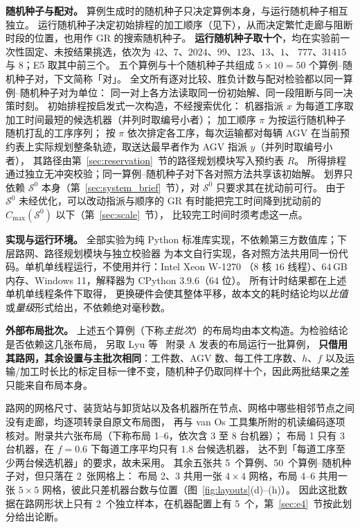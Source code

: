 \documentclass[manuscript,screen,review]{acmart}
\newcommand{\NInst}{5}
\newcommand{\NSeeds}{10}
\newcommand{\NPairs}{50}
\newcommand{\NPubInst}{5}
\newcommand{\NPubPairs}{50}
\newcommand{\NPubNets}{2}
\begin{document}
\textbf{随机种子与配对。}
算例生成时的随机种子只决定算例本身，与运行随机种子相互独立。
运行随机种子决定初始排程的加工顺序（见下），从而决定繁忙走廊与阻断时段的位置，也用作 GR 的搜索随机种子。
\textbf{运行随机种子取十个}，均在实验前一次性固定、未按结果挑选，依次为 \(42\)、\(7\)、\(2024\)、\(99\)、\(123\)、\(13\)、\(1\)、
\(777\)、\(31415\) 与 \(8\)；E5 取其中前三个。
五个算例与十个随机种子共组成 \(\NInst\times\NSeeds=\NPairs\) 个算例--随机种子对，下文简称「对」。
全文所有逐对比较、胜负计数与配对检验都以同一算例--随机种子对为单位：
同一对上各方法读取同一份初始解、同一段阻断与同一决策时刻。
初始排程按启发式一次构造，不经搜索优化：
机器指派 \(x\) 为每道工序取加工时间最短的候选机器（并列时取编号小者）；
加工顺序 \(\pi\) 为按运行随机种子随机打乱的工序序列；
按 \(\pi\) 依次排定各工序，每次运输都对每辆 AGV 在当前预约表上实际规划整条轨迹，取送达最早者作为 AGV 指派 \(y\)（并列时取编号小者），
其路径由第~\ref{sec:reservation}~节的路径规划模块写入预约表 \(R\)。
所得排程通过独立无冲突校验；同一算例--随机种子对下各对照方法共享该初始解。
划界只依赖 \(\mathcal{S}^0\) 本身（第~\ref{sec:system_brief}~节），对 \(\mathcal{S}^0\) 只要求其在扰动前可行。
由于 \(\mathcal{S}^0\) 未经优化，可以改动指派与顺序的 GR 有时能把完工时间降到扰动前的 \(C_{\max}(\mathcal{S}^0)\) 以下（第~\ref{sec:scale}~节），
比较完工时间时须考虑这一点。

\textbf{实现与运行环境。}
全部实验为纯 Python 标准库实现，不依赖第三方数值库；下层路网、路径规划模块与独立校验器
为本文自行实现，各对照方法共用同一份代码。单机单线程运行，不使用并行：Intel Xeon W-1270
（\(8\) 核 \(16\) 线程）、\(64\)\,GB 内存、Windows 11，解释器为 CPython \(3.9.6\)（\(64\) 位）。
所有计时结果都在上述单机单线程条件下取得，
更换硬件会使其整体平移，故本文的耗时结论均以\emph{比值}或\emph{量级}形式给出，不依赖绝对毫秒数。

\textbf{外部布局批次。}
上述五个算例（下称\emph{主批次}）的布局均由本文构造。为检验结论是否依赖这几张布局，
另取 Lyu 等~\cite{lyu2019approach} 附录 A 发表的布局运行一批算例，
\textbf{只借用其路网，其余设置与主批次相同}：工件数、AGV 数、每工件工序数、\(h\)、\(f\)
以及运输/加工时长比的标定目标一律不变，随机种子仍取同样十个，因此两批结果之差只能来自布局本身。

路网的网格尺寸、装货站与卸货站以及各机器所在节点、网格中哪些相邻节点之间没有走廊，均逐项转录自原文布局图，
再与 van Os 工具集所附的机读编码逐项核对。附录共六张布局（下称布局 1--6，依次含 \(3\) 至 \(8\) 台机器）；
布局 1 只有 \(3\) 台机器，在 \(f=0.6\) 下每道工序平均只有 \(1.8\) 台候选机器，
达不到「每道工序至少两台候选机器」的要求，故未采用。
其余五张共 \NPubInst\ 个算例、\NPubPairs\ 个算例--随机种子对，但只落在 \NPubNets\ 张网格上：
布局 2、3 共用一张 \(4\times4\) 网格，布局 4--6 共用一张 \(5\times5\) 网格，彼此只差机器台数与位置（图~\ref{fig:layouts}(d)--(h)）。
因此这批数据在路网形状上只有 \NPubNets\ 个独立样本，在机器配置上有 \NPubInst\ 个，第~\ref{sec:e4}~节按此划分给出论断。
\end{document}

